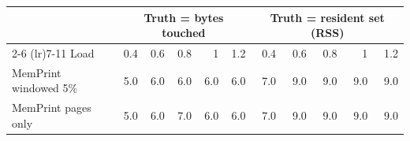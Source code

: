 \begin{tabular}{lrrrrrrrrrr}
\toprule
 & \multicolumn{5}{c}{Truth = bytes touched} & \multicolumn{5}{c}{Truth = resident set (RSS)} \\
\cmidrule(lr){2-6} \cmidrule(lr){7-11}
Load & 0.4 & 0.6 & 0.8 & 1 & 1.2 & 0.4 & 0.6 & 0.8 & 1 & 1.2 \\
\midrule
MemPrint windowed 5\% & 5.0 & 6.0 & 6.0 & 6.0 & 6.0 & 7.0 & 9.0 & 9.0 & 9.0 & 9.0 \\
MemPrint pages only & 5.0 & 6.0 & 7.0 & 6.0 & 6.0 & 7.0 & 9.0 & 9.0 & 9.0 & 9.0 \\
\bottomrule
\end{tabular}
